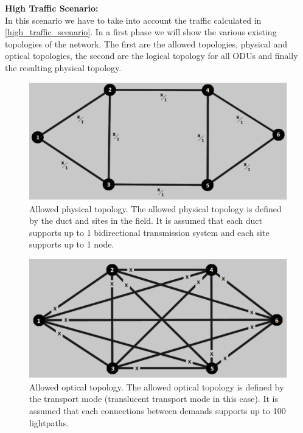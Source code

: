 \noindent
\textbf{High Traffic Scenario:}\\

In this scenario we have to take into account the traffic calculated in \ref{high_traffic_scenario}. In a first phase we will show the various existing topologies of the network. The first are the allowed topologies, physical and optical topologies, the second are the logical topology for all ODUs and finally the resulting physical topology.\\

\begin{figure}[H]
\centering
\includegraphics[width=13cm]{sdf/heuristic/translucent_protection/figures/allowed_physical}
\caption{Allowed physical topology. The allowed physical topology is defined by the duct and sites in the field. It is assumed that each duct supports up to 1 bidirectional transmission system and each site supports up to 1 node.}
\label{allowed_physical_protec_ref_high_heuristic_translucent}
\end{figure}

\begin{figure}[H]
\centering
\includegraphics[width=13cm]{sdf/heuristic/translucent_protection/figures/allowed_optical}
\caption{Allowed optical topology. The allowed optical topology is defined by the transport mode (translucent transport mode in this case). It is assumed that each connections between demands supports up to 100 lightpaths.}
\label{allowed_optical_protec_ref_high_heuristic_translucent}
\end{figure}

